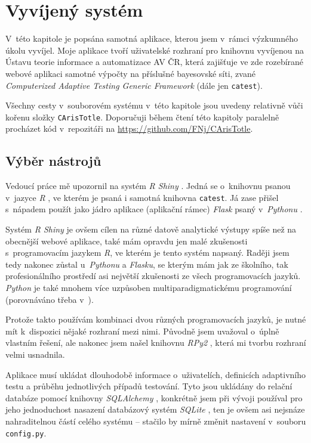 \documentclass[a4paper,twoside,12pt]{scrbook}
\begin{document}

\chapter{Vyvíjený systém}
V~této kapitole je popsána samotná aplikace, kterou jsem v~rámci výzkumného úkolu vyvíjel. Moje aplikace tvoří uživatelské rozhraní pro knihovnu vyvíjenou na Ústavu teorie informace a automatizace AV ČR, která zajišťuje ve zde rozebírané webové aplikaci samotné výpočty na příslušné bayesovské síti, zvané \textit{Computerized Adaptive Testing Generic Framework} (dále jen \texttt{catest}).

Všechny cesty v~souborovém systému v~této kapitole jsou uvedeny relativně vůči kořenu složky \texttt{CArisTotle}. Doporučuji během čtení této kapitoly paralelně procházet kód v~repozitáři na \url{https://github.com/FNj/CArisTotle}.

\section{Výběr nástrojů}
Vedoucí práce mě upozornil na systém \textit{R Shiny}  \cite{r_shiny}. Jedná se o~knihovnu psanou v~jazyce \textit{R} \cite{R}, ve kterém je psaná i samotná knihovna \texttt{catest}. Já zase přišel s~nápadem použít jako jádro aplikace  (aplikační rámec) \textit{Flask}  \cite{flask} psaný v~\textit{Pythonu}  \cite{python}.

Systém \textit{R Shiny} je ovšem cílen na různé datově analytické výstupy spíše než na obecnější webové aplikace, také mám opravdu jen malé zkušenosti s~programovacím jazykem \textit{R}, ve kterém je tento systém napsaný. Raději jsem tedy nakonec zůstal u~\textit{Pythonu} a \textit{Flasku}, se kterým mám jak ze školního, tak profesionálního prostředí asi největší zkušenosti ze všech programovacích jazyků. \textit{Python} je také mnohem více uzpůsoben multiparadigmatickému programování (porovnáváno třeba v~\cite{multiparadigm}).

Protože takto používám kombinaci dvou různých programovacích jazyků, je nutné mít k~dispozici nějaké rozhraní mezi nimi. Původně jsem uvažoval o~úplně vlastním řešení, ale nakonec jsem našel knihovnu \textit{RPy2} \cite{rpy2}, která mi tvorbu rozhraní velmi usnadnila.

Aplikace musí ukládat dlouhodobě informace o~uživatelích, definicích adaptivního testu a průběhu jednotlivých případů testování. Tyto jsou ukládány do relační databáze pomocí knihovny \textit{SQLAlchemy} \cite{sqlalchemy}, konkrétně jsem při vývoji používal pro jeho jednoduchost nasazení databázový systém \textit{SQLite} \cite{sqlite}, ten je ovšem asi nejsnáze nahraditelnou částí celého systému -- stačilo by mírně změnit nastavení v~souboru \texttt{config.py}.
\end{document}
